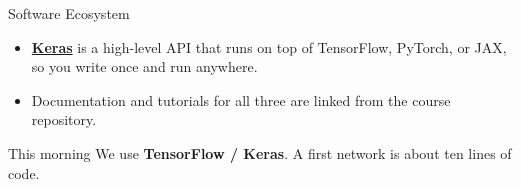 \documentclass[aspectratio=169,11pt]{beamer}
\begin{document}
\begin{frame}{Software Ecosystem}
\begin{center}
\end{center}

\vspace{0.5cm}
\begin{itemize}
    \item \href{https://keras.io}{\textbf{Keras}} is a high-level API that runs on top of TensorFlow, PyTorch, or JAX, so you write once and run anywhere.
    \item Documentation and tutorials for all three are linked from the course repository.
\end{itemize}

\vspace{0.4cm}
\begin{exampleblock}{This morning}
\centering We use \textbf{TensorFlow / Keras}.  A first network is about ten lines of code.
\end{exampleblock}
\end{frame}
\end{document}
